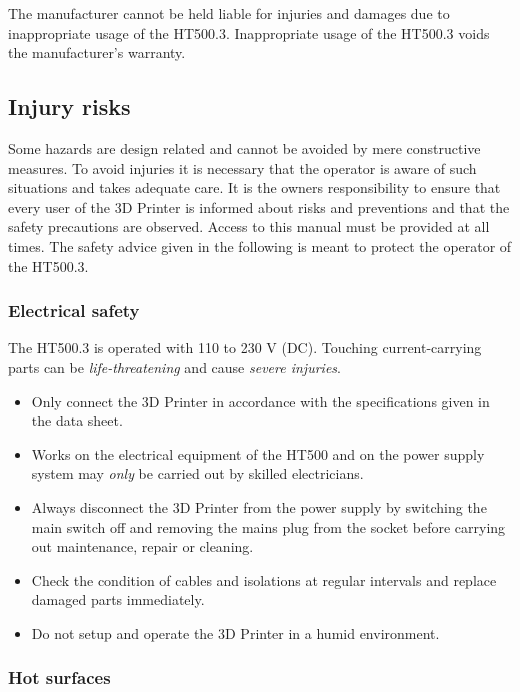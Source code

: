 \begin{info}
  The manufacturer cannot be held liable for injuries and damages due to inappropriate usage of the HT500.3.
  Inappropriate usage of the HT500.3 voids the manufacturer's warranty.
\end{info}



\subsection{Injury risks}

Some hazards are design related and cannot be avoided by mere constructive measures. To avoid injuries it is necessary that the operator is aware of such situations and takes adequate care. It is the owners responsibility to ensure that every user of the 3D Printer is informed about risks and preventions and that the safety precautions are observed. Access to this manual must be provided at all times.
The safety advice given in the following is meant to protect the operator of the HT500.3.


\subsubsection{Electrical safety}

The HT500.3 is operated with 110 to 230 V (DC). 
Touching current-carrying parts can be \emph{life-threatening} and cause \emph{severe injuries}.

\begin{itemize}    
  \item Only connect the 3D Printer in accordance with the specifications given in the data sheet.
  \item Works on the electrical equipment of the HT500 and on the power supply system may \emph{only} be carried out by skilled electricians.
  \item Always disconnect the 3D Printer from the power supply by switching the main switch off and removing the mains plug from the socket 
        before carrying out maintenance, repair or cleaning.
  \item Check the condition of cables and isolations at regular intervals and replace damaged parts immediately.
  \item Do not setup and operate the 3D Printer in a humid environment.
\end{itemize}


\subsubsection{Hot surfaces}

